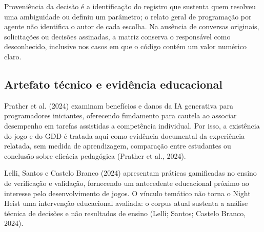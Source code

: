 Proveniência da decisão é a identificação do registro que sustenta quem resolveu uma ambiguidade ou definiu um parâmetro; o relato geral de programação por agente não identifica o autor de cada escolha. Na ausência de conversas originais, solicitações ou decisões assinadas, a matriz conserva o responsável como desconhecido, inclusive nos casos em que o código contém um valor numérico claro.

\subsection{Artefato técnico e evidência educacional}
Prather et al. (2024) examinam benefícios e danos da IA generativa para programadores iniciantes, oferecendo fundamento para cautela ao associar desempenho em tarefas assistidas a competência individual. Por isso, a existência do jogo e do GDD é tratada aqui como evidência documental da experiência relatada, sem medida de aprendizagem, comparação entre estudantes ou conclusão sobre eficácia pedagógica (Prather et al., 2024).

Lelli, Santos e Castelo Branco (2024) apresentam práticas gamificadas no ensino de verificação e validação, fornecendo um antecedente educacional próximo ao interesse pelo desenvolvimento de jogos. O vínculo temático não torna o Night Heist uma intervenção educacional avaliada: o corpus atual sustenta a análise técnica de decisões e não resultados de ensino (Lelli; Santos; Castelo Branco, 2024).
